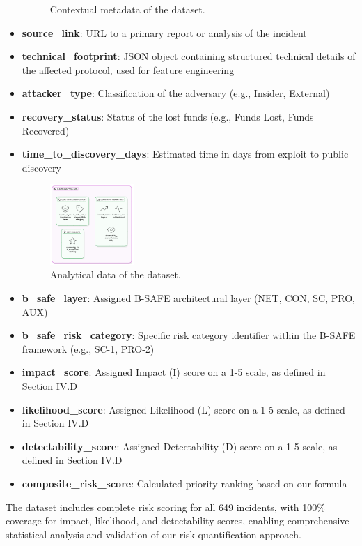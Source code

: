 \begin{itemize}
\begin{figure}[H]
        \caption{Contextual metadata of the dataset.}
        \label{fig:contextual_data}
    \end{figure}
    \item \textbf{source\_link}: URL to a primary report or analysis of the incident
    \item \textbf{technical\_footprint}: JSON object containing structured technical details of the affected protocol, used for feature engineering
    \item \textbf{attacker\_type}: Classification of the adversary (e.g., Insider, External)
    \item \textbf{recovery\_status}: Status of the lost funds (e.g., Funds Lost, Funds Recovered)
    \item \textbf{time\_to\_discovery\_days}: Estimated time in days from exploit to public discovery
    \begin{figure}[H]
        \centering
        \includegraphics[width=0.3\textwidth]{../figure/methodology/analytical_data.jpg}
        \caption{Analytical data of the dataset.}
        \label{fig:analytical_data}
    \end{figure}
    \item \textbf{b\_safe\_layer}: Assigned B-SAFE architectural layer (NET, CON, SC, PRO, AUX)
    \item \textbf{b\_safe\_risk\_category}: Specific risk category identifier within the B-SAFE framework (e.g., SC-1, PRO-2)
    \item \textbf{impact\_score}: Assigned Impact (I) score on a 1-5 scale, as defined in Section IV.D
    \item \textbf{likelihood\_score}: Assigned Likelihood (L) score on a 1-5 scale, as defined in Section IV.D
    \item \textbf{detectability\_score}: Assigned Detectability (D) score on a 1-5 scale, as defined in Section IV.D
    \item \textbf{composite\_risk\_score}: Calculated priority ranking based on our formula
\end{itemize}

The dataset includes complete risk scoring for all 649 incidents, with 100\% coverage for impact, likelihood, and detectability scores, enabling comprehensive statistical analysis and validation of our risk quantification approach.

